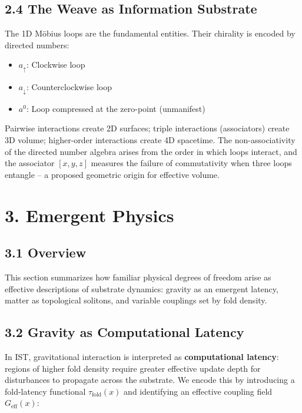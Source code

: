 \documentclass[
  11pt,
]{article}
\providecommand{\tightlist}{%
  \setlength{\itemsep}{0pt}\setlength{\parskip}{0pt}}
\begin{document}
\subsection{2.4 The Weave as Information
Substrate}\label{the-weave-as-information-substrate}

The 1D Möbius loops are the fundamental entities. Their chirality is
encoded by directed numbers:

\begin{itemize}
\tightlist
\item
  \textbf{\(a_{\uparrow}\)}: Clockwise loop
\item
  \textbf{\(a_{\downarrow}\)}: Counterclockwise loop
\item
  \textbf{\(a^0\)}: Loop compressed at the zero-point (unmanifest)
\end{itemize}

Pairwise interactions create 2D surfaces; triple interactions
(associators) create 3D volume; higher-order interactions create 4D
spacetime. The non-associativity of the directed number algebra arises
from the order in which loops interact, and the associator \([x, y, z]\)
measures the failure of commutativity when three loops entangle -- a
proposed geometric origin for effective volume.

\section{3. Emergent Physics}\label{emergent-physics}

\subsection{3.1 Overview}\label{overview}

This section summarizes how familiar physical degrees of freedom arise
as effective descriptions of substrate dynamics: gravity as an emergent
latency, matter as topological solitons, and variable couplings set by
fold density.

\subsection{3.2 Gravity as Computational
Latency}\label{gravity-as-computational-latency}

In IST, gravitational interaction is interpreted as
\textbf{computational latency}: regions of higher fold density require
greater effective update depth for disturbances to propagate across the
substrate. We encode this by introducing a fold-latency functional
\(\tau_{\text{fold}}(x)\) and identifying an effective coupling field
\(G_{\text{eff}}(x)\):
\end{document}
